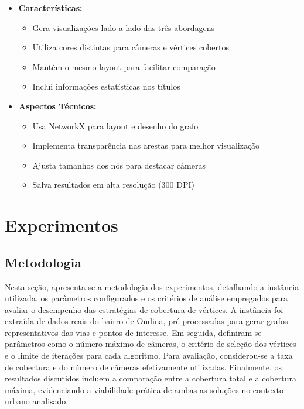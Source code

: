\documentclass[12pt, a4paper]{report}
\begin{document}
\begin{itemize}
    \item \textbf{Características:}
    \begin{itemize}
        \item Gera visualizações lado a lado das três abordagens
        \item Utiliza cores distintas para câmeras e vértices cobertos
        \item Mantém o mesmo layout para facilitar comparação
        \item Inclui informações estatísticas nos títulos
    \end{itemize}
    
    \item \textbf{Aspectos Técnicos:}
    \begin{itemize}
        \item Usa NetworkX para layout e desenho do grafo
        \item Implementa transparência nas arestas para melhor visualização
        \item Ajusta tamanhos dos nós para destacar câmeras
        \item Salva resultados em alta resolução (300 DPI)
    \end{itemize}
\end{itemize}

\chapter{Experimentos}

\section{Metodologia}
\noindent
Nesta seção, apresenta-se a metodologia dos experimentos, detalhando a instância utilizada, os parâmetros configurados e os critérios de análise empregados para avaliar o desempenho das estratégias de cobertura de vértices. A instância foi extraída de dados reais do bairro de Ondina, pré-processadas para gerar grafos representativos das vias e pontos de interesse. Em seguida, definiram-se parâmetros como o número máximo de câmeras, o critério de seleção dos vértices e o limite de iterações para cada algoritmo. Para avaliação, considerou-se a taxa de cobertura e do número de câmeras efetivamente utilizadas. Finalmente, os resultados discutidos incluem a comparação entre a cobertura total e a cobertura máxima, evidenciando a viabilidade prática de ambas as soluções no contexto urbano analisado.
\end{document}
